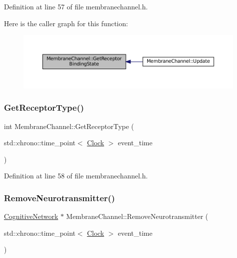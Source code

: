 Definition at line 57 of file membranechannel.\+h.

Here is the caller graph for this function\+:\nopagebreak
\begin{figure}[H]
\begin{center}
\leavevmode
\includegraphics[width=350pt]{class_membrane_channel_a8eb115e2583e5bf0f37156f1fc974aa6_icgraph}
\end{center}
\end{figure}
\mbox{\label{class_membrane_channel_aa37056ebb4e757a5ed00252112b516aa}} 
\subsubsection{\texorpdfstring{Get\+Receptor\+Type()}{GetReceptorType()}}
{\footnotesize\ttfamily int Membrane\+Channel\+::\+Get\+Receptor\+Type (\begin{DoxyParamCaption}\item[{std\+::chrono\+::time\+\_\+point$<$ \mbox{\hyperlink{universe_8h_a0ef8d951d1ca5ab3cfaf7ab4c7a6fd80}{Clock}} $>$}]{event\+\_\+time }\end{DoxyParamCaption})\hspace{0.3cm}{\ttfamily [inline]}}



Definition at line 58 of file membranechannel.\+h.

\mbox{\label{class_membrane_channel_a2252f222f4a41bf1975dc856569e0a22}} 
\subsubsection{\texorpdfstring{Remove\+Neurotransmitter()}{RemoveNeurotransmitter()}}
{\footnotesize\ttfamily \mbox{\hyperlink{class_cognitive_network}{Cognitive\+Network}} $\ast$ Membrane\+Channel\+::\+Remove\+Neurotransmitter (\begin{DoxyParamCaption}\item[{std\+::chrono\+::time\+\_\+point$<$ \mbox{\hyperlink{universe_8h_a0ef8d951d1ca5ab3cfaf7ab4c7a6fd80}{Clock}} $>$}]{event\+\_\+time }\end{DoxyParamCaption})}



